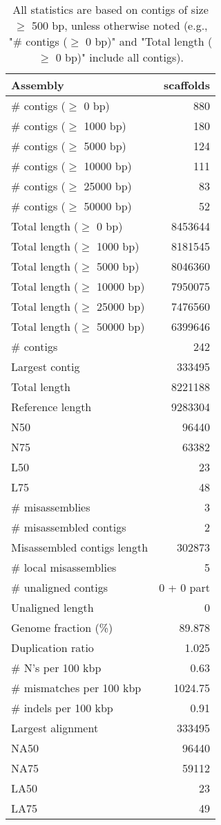 \documentclass[12pt,a4paper]{article}
\begin{document}
\begin{table}[ht]
\begin{center}
\caption{All statistics are based on contigs of size $\geq$ 500 bp, unless otherwise noted (e.g., "\# contigs ($\geq$ 0 bp)" and "Total length ($\geq$ 0 bp)" include all contigs).}
\begin{tabular}{|l*{1}{|r}|}
\hline
Assembly & scaffolds \\ \hline
\# contigs ($\geq$ 0 bp) & 880 \\ \hline
\# contigs ($\geq$ 1000 bp) & 180 \\ \hline
\# contigs ($\geq$ 5000 bp) & 124 \\ \hline
\# contigs ($\geq$ 10000 bp) & 111 \\ \hline
\# contigs ($\geq$ 25000 bp) & 83 \\ \hline
\# contigs ($\geq$ 50000 bp) & 52 \\ \hline
Total length ($\geq$ 0 bp) & 8453644 \\ \hline
Total length ($\geq$ 1000 bp) & 8181545 \\ \hline
Total length ($\geq$ 5000 bp) & 8046360 \\ \hline
Total length ($\geq$ 10000 bp) & 7950075 \\ \hline
Total length ($\geq$ 25000 bp) & 7476560 \\ \hline
Total length ($\geq$ 50000 bp) & 6399646 \\ \hline
\# contigs & 242 \\ \hline
Largest contig & 333495 \\ \hline
Total length & 8221188 \\ \hline
Reference length & 9283304 \\ \hline
N50 & 96440 \\ \hline
N75 & 63382 \\ \hline
L50 & 23 \\ \hline
L75 & 48 \\ \hline
\# misassemblies & 3 \\ \hline
\# misassembled contigs & 2 \\ \hline
Misassembled contigs length & 302873 \\ \hline
\# local misassemblies & 5 \\ \hline
\# unaligned contigs & 0 + 0 part \\ \hline
Unaligned length & 0 \\ \hline
Genome fraction (\%) & 89.878 \\ \hline
Duplication ratio & 1.025 \\ \hline
\# N's per 100 kbp & 0.63 \\ \hline
\# mismatches per 100 kbp & 1024.75 \\ \hline
\# indels per 100 kbp & 0.91 \\ \hline
Largest alignment & 333495 \\ \hline
NA50 & 96440 \\ \hline
NA75 & 59112 \\ \hline
LA50 & 23 \\ \hline
LA75 & 49 \\ \hline
\end{tabular}
\end{center}
\end{table}
\end{document}
